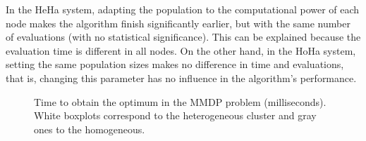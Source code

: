 \documentclass[final,1p,times]{elsarticle}
\begin{document}
 In the HeHa system, adapting the population to the computational
 power of each node makes the algorithm finish significantly earlier,
 but with the same number of evaluations (with no statistical
 significance). This can be explained because the evaluation time is
 different in all nodes. On the other hand, in the HoHa system,
 setting the same population sizes makes no difference in time and
 evaluations, that is, changing this parameter has no influence in the
 algorithm's performance.  

\begin{table*}
\centering
\caption{Results for the MMDP problem.}
\label{tab:resultsMMDP}
\end{table*}






\begin{figure}[htb]
\centering
{}
\caption{Time to obtain the optimum in the MMDP problem (milliseconds). White boxplots correspond to the heterogeneous cluster and gray ones to the homogeneous.}
\label{fig:timeMMDP}
\end{figure}
\end{document}
